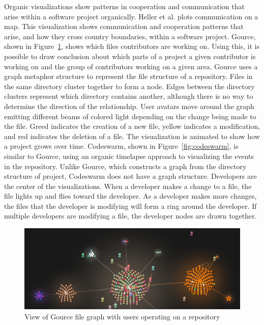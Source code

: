 Organic visualizations show patterns in cooperation and communication
that arise within a software project organically. Heller et
al.\cite{Heller2011} plots communication on a map. This visualization
shows communication and cooperation patterns that arise, and how they
cross country boundaries, within a software project.
Gource\cite{Caudwell2010}, shown in Figure~\ref{fig:gource_view}, shows
which files contributors are working on. Using this, it is possible to
draw conclusion about which parts of a project a given contributor is
working on and the group of contributors working on a given area. Gource
uses a graph metaphor structure to represent the file structure of a
repository. Files in the same directory cluster together to form a node.
Edges between the directory clusters represent which directory contains
another, although there is no way to determine the direction of the
relationship. User avatars move around the graph emitting different
beams of colored light depending on the change being made to the file.
Greed indicates the creation of a new file, yellow indicates a
modification, and red indicates the deletion of a file. The
visualization is animated to show how a project grows over time.
Codeswarm\cite{ogawa09}, shown in Figure~\ref{fig:codeswarm}, is similar
to Gource, using an organic timelapse approach to visualizing the events
in the repository. Unlike Gource, which constructs a graph from the
directory structure of project, Codeswarm does not have a graph
structure. Developers are the center of the visualizations. When a
developer makes a change to a file, the file lights up and flies toward
the developer. As a developer makes more changes, the files that the
developer is modifying will form a ring around the developer. If
multiple developers are modifying a file, the developer nodes are drawn
together.

\begin{figure}[htpb]
  \centering
  \includegraphics[width=0.8\linewidth]{./Figures/introduction/gource-linux.jpg}
  \caption{View of Gource file graph with users operating on a
    repository}
  \label{fig:gource_view}
\end{figure}

